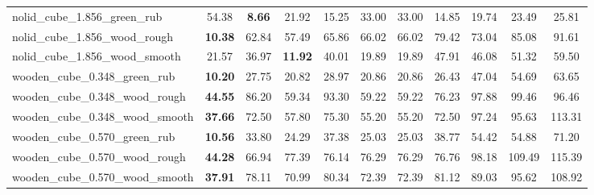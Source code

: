 \begin{table}[H]
{\begin{tabular}{l cccccccccc}
        nolid\_cube\_1.856\_green\_rub & 54.38 & \textbf{8.66} & 21.92 & 15.25 & 33.00 & 33.00 & 14.85 & 19.74 & 23.49 & 25.81 \\
        nolid\_cube\_1.856\_wood\_rough & \textbf{10.38} & 62.84 & 57.49 & 65.86 & 66.02 & 66.02 & 79.42 & 73.04 & 85.08 & 91.61 \\
        nolid\_cube\_1.856\_wood\_smooth & 21.57 & 36.97 & \textbf{11.92} & 40.01 & 19.89 & 19.89 & 47.91 & 46.08 & 51.32 & 59.50 \\
        wooden\_cube\_0.348\_green\_rub & \textbf{10.20} & 27.75 & 20.82 & 28.97 & 20.86 & 20.86 & 26.43 & 47.04 & 54.69 & 63.65 \\
        wooden\_cube\_0.348\_wood\_rough & \textbf{44.55} & 86.20 & 59.34 & 93.30 & 59.22 & 59.22 & 76.23 & 97.88 & 99.46 & 96.46 \\
        wooden\_cube\_0.348\_wood\_smooth & \textbf{37.66} & 72.50 & 57.80 & 75.30 & 55.20 & 55.20 & 72.50 & 97.24 & 95.63 & 113.31 \\
        wooden\_cube\_0.570\_green\_rub & \textbf{10.56} & 33.80 & 24.29 & 37.38 & 25.03 & 25.03 & 38.77 & 54.42 & 54.88 & 71.20 \\
        wooden\_cube\_0.570\_wood\_rough & \textbf{44.28} & 66.94 & 77.39 & 76.14 & 76.29 & 76.29 & 76.76 & 98.18 & 109.49 & 115.39 \\
        wooden\_cube\_0.570\_wood\_smooth & \textbf{37.91} & 78.11 & 70.99 & 80.34 & 72.39 & 72.39 & 81.12 & 89.03 & 95.62 & 108.92 \\
        \bottomrule
    \end{tabular}
    }
\end{table}



\vspace{1cm}

\clearpage

